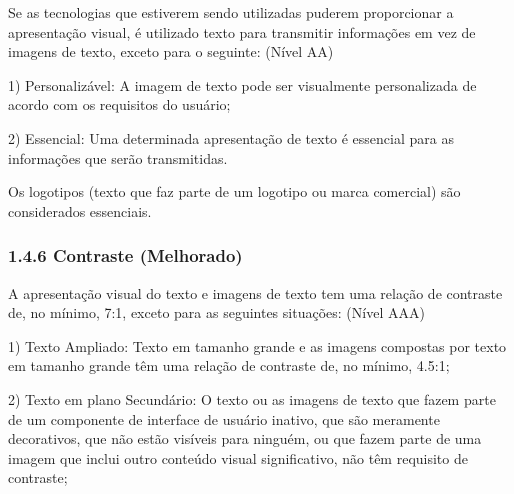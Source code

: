 \documentclass[a4paper]{article}
\begin{document}
\begin{titlepage}
Se as tecnologias que estiverem sendo utilizadas puderem proporcionar a apresentação visual, é utilizado texto para transmitir informações em vez de imagens de texto, exceto para o seguinte: (Nível AA)\\

\hspace{.1\textwidth} %
\begin{minipage}{.85\textwidth}
		1) Personalizável: A imagem de texto pode ser visualmente personalizada de acordo com os requisitos do usuário;\\
\end{minipage}

\hspace{.1\textwidth} %
\begin{minipage}{.85\textwidth}
	2) Essencial: Uma determinada apresentação de texto é essencial para as informações que serão transmitidas.\\
\end{minipage}

Os logotipos (texto que faz parte de um logotipo ou marca comercial) são considerados essenciais.

\subsubsection{1.4.6 Contraste (Melhorado)}

A apresentação visual do texto e imagens de texto tem uma relação de contraste de, no mínimo, 7:1, exceto para as seguintes situações: (Nível AAA)\\

\hspace{.1\textwidth} %
\begin{minipage}{.85\textwidth}
	1) Texto Ampliado: Texto em tamanho grande e as imagens compostas por texto em tamanho grande têm uma relação de contraste de, no mínimo, 4.5:1;\\
\end{minipage}

\hspace{.1\textwidth} %
\begin{minipage}{.85\textwidth}
	2) Texto em plano Secundário: O texto ou as imagens de texto que fazem parte de um componente de interface de usuário inativo, que são meramente decorativos, que não estão visíveis para ninguém, ou que fazem parte de uma imagem que inclui outro conteúdo visual significativo, não têm requisito de contraste;\\
\end{minipage}


\end{titlepage}
\end{document}
